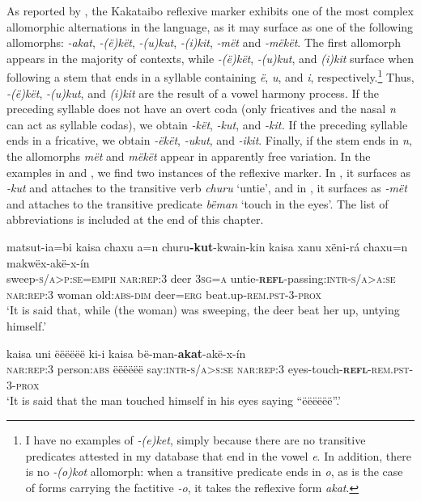 \documentclass[output=paper,colorlinks,citecolor=brown,modfonts,nonflat]{langscibook}
\begin{document}
As reported by \citet[307]{Zariquiey2018}, the Kakataibo reflexive marker exhibits one of the most complex allomorphic alternations in the language, as it may surface as one of the following allomorphs: \textit{{}-akat}, \textit{{}-(ë)kët}, \textit{{}-(u)kut}, \textit{{}-(i)kit}, \textit{-mët} and \textit{{}-mëkët}. The first allomorph appears in the majority of contexts, while \textit{{}-(ë)kët}, \textit{{}-(u)kut}, and \textit{(i)kit} surface when following a stem that ends in a syllable containing \textit{ë}, \textit{u}, and \textit{i}, respectively.\footnote{I have no examples of \textit{{}-(e)ket}, simply because there are no transitive predicates attested in my database that end in the vowel \textit{e}. In addition, there is no \textit{{}-(o)kot} allomorph: when a transitive predicate ends in \textit{o}, as is the case of forms carrying the factitive \textit{{}-o}, it takes the reflexive form \textit{akat}.} Thus, \textit{{}-(ë)kët}, \textit{{}-(u)kut}, and \textit{(i)kit} are the result of a vowel harmony process. If the preceding syllable does not have an overt coda (only fricatives and the nasal \textit{n} can act as syllable codas), we obtain \textit{{}-kët}, \textit{{}-kut}, and \textit{{}-kit.} If the preceding syllable ends in a fricative, we obtain \textit{{}-ëkët}, \textit{{}-ukut}, and \textit{{}-ikit}. Finally, if the stem ends in \textit{n}, the allomorphs \textit{mët} and \textit{mëkët} appear in apparently free variation. In the examples in  and , we find two instances of the reflexive marker. In , it surfaces as \textit{{}-kut} and attaches to the transitive verb \textit{churu} ‘untie’, and in , it surfaces as \textit{{}-mët} and attaches to the transitive predicate \textit{bëman} ‘touch in the eyes’. The list of abbreviations is included at the end of this chapter.

\ea%
    \label{ex:zariquiey:7}
    \gll    matsut-ia=bi kaisa chaxu a=n churu\textbf{-kut}-kwain-kin kaisa xanu xëni-rá chaxu=n makwëx-akë-x-ín\\
            sweep-\textsc{s/a>p:se=emph} \textsc{nar:rep:3} deer \textsc{3sg=a} untie-\textbf{\textsc{refl}}-passing:\textsc{intr-s/a>a:se} \textsc{nar:rep:3} woman    old:\textsc{abs-dim} deer=\textsc{erg} beat.up-\textsc{rem.pst-3-prox}\\
    \glt    ‘It is said that, while (the woman) was sweeping, the deer beat her up, untying himself.’
\z

\ea%
    \label{ex:zariquiey:8}
    \gll    kaisa    uni    ëëëëëë ki-i        kaisa    bë-man-\textbf{akat}-akë-x-ín\\
            \textsc{nar:rep:3} person:\textsc{abs} ëëëëëë say:\textsc{intr-s/a>s:se} \textsc{nar:rep:3} eyes-touch-\textbf{\textsc{refl}}\textsc{{}-rem.pst-3-prox}\\
    \glt    ‘It is said that the man touched himself in his eyes saying “ëëëëëë”.’
\z
\end{document}
